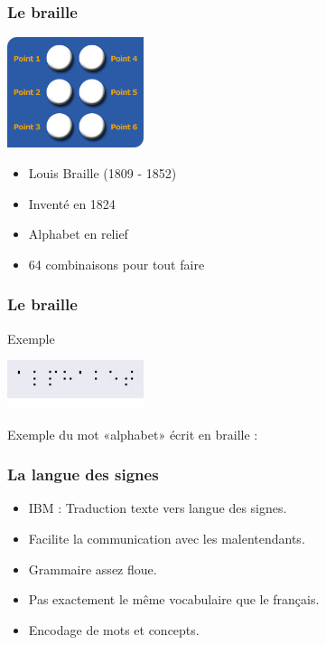 \documentclass{beamer}
\begin{document}
\begin{frame}  
  \frametitle{Le braille}
  \begin{center}
  \includegraphics[width=4cm]{./include/cellule_braille.jpg}
  \end{center}
  \normalsize \begin{itemize}
  \item Louis Braille (1809 - 1852)
  \item Inventé en 1824
  \item Alphabet en relief
  \item 64 combinaisons pour tout faire
  \end{itemize}
\end{frame}

\begin{frame}  
  \frametitle{Le braille}
  \begin{block}{Exemple}
  \begin{center}
  \includegraphics[width=4cm]{./include/braille_alphabet.jpg}
  \end{center}
  Exemple du mot «alphabet» écrit en braille :
  \end{block}
\end{frame}


\begin{frame}  
  \frametitle{La langue des signes}
  \begin{itemize}
  \item IBM : Traduction texte vers langue des signes.
  \item Facilite la communication avec les malentendants.
  \item Grammaire assez floue.
  \item Pas exactement le même vocabulaire que le français.
  \item Encodage de mots et concepts.
  \end{itemize}
\end{frame}
\end{document}
